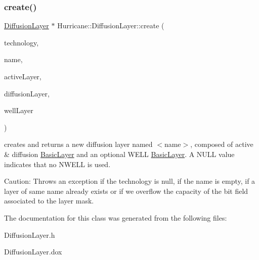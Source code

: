 \subsubsection{\texorpdfstring{create()}{create()}}
{\footnotesize\ttfamily \hyperlink{classHurricane_1_1DiffusionLayer}{Diffusion\+Layer} $\ast$ Hurricane\+::\+Diffusion\+Layer\+::create (\begin{DoxyParamCaption}\item[{\hyperlink{classHurricane_1_1Technology}{Technology} $\ast$}]{technology,  }\item[{const \hyperlink{classHurricane_1_1Name}{Name} \&}]{name,  }\item[{\hyperlink{classHurricane_1_1BasicLayer}{Basic\+Layer} $\ast$}]{active\+Layer,  }\item[{\hyperlink{classHurricane_1_1BasicLayer}{Basic\+Layer} $\ast$}]{diffusion\+Layer,  }\item[{\hyperlink{classHurricane_1_1BasicLayer}{Basic\+Layer} $\ast$}]{well\+Layer }\end{DoxyParamCaption})\hspace{0.3cm}{\ttfamily [static]}}

creates and returns a new diffusion layer named {\ttfamily $<$name$>$}, composed of active \& diffusion \hyperlink{classHurricane_1_1BasicLayer}{Basic\+Layer} and an optional W\+E\+LL \hyperlink{classHurricane_1_1BasicLayer}{Basic\+Layer}. A N\+U\+LL value indicates that no N\+W\+E\+LL is used.

\begin{DoxyParagraph}{Caution\+:}
Throws an exception if the technology is null, if the name is empty, if a layer of same name already exists or if we overflow the capacity of the bit field associated to the layer mask. 
\end{DoxyParagraph}


The documentation for this class was generated from the following files\+:\begin{DoxyCompactItemize}
\item 
Diffusion\+Layer.\+h\item 
Diffusion\+Layer.\+dox\end{DoxyCompactItemize}

